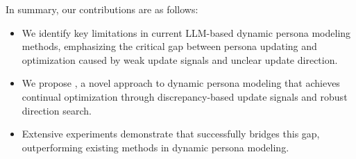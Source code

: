 In summary, our contributions are as follows:

\begin{itemize}[noitemsep,left=0pt]
    \item We identify key limitations in current LLM-based dynamic persona modeling methods, emphasizing the critical gap between persona updating and optimization caused by weak update signals and unclear update direction.

    \item We propose \method, a novel approach to dynamic persona modeling that achieves continual optimization through discrepancy-based update signals and robust direction search.

    \item Extensive experiments demonstrate that \method successfully bridges this gap, outperforming existing methods in dynamic persona modeling.
\end{itemize}












 






























